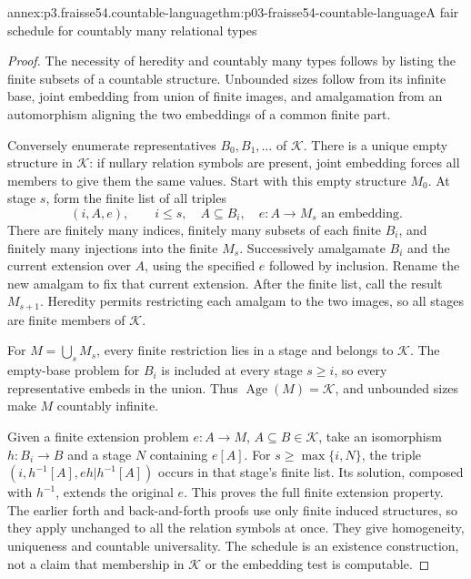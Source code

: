 \begin{annexitem}{annex:p3.fraisse54.countable-language}{thm:p03-fraisse54-countable-language}{A fair schedule for countably many relational types}
\begin{proof}
The necessity of heredity and countably many types follows by listing the
finite subsets of a countable structure. Unbounded sizes follow from its
infinite base, joint embedding from union of finite images, and amalgamation
from an automorphism aligning the two embeddings of a common finite part.

Conversely enumerate representatives \(B_0,B_1,\ldots\) of
\(\mathcal K\). There is a unique empty structure in \(\mathcal K\):
if nullary relation symbols are present, joint embedding forces all members
to give them the same values. Start with this empty structure \(M_0\).
At stage \(s\), form the finite list of all triples
\[
 (i,A,e),\qquad i\leq s,\quad A\subseteq B_i,
 \quad e:A\longrightarrow M_s\text{ an embedding}.
\]
There are finitely many indices, finitely many subsets of each finite
\(B_i\), and finitely many injections into the finite \(M_s\).
Successively amalgamate \(B_i\) and the current extension over \(A\),
using the specified \(e\) followed by inclusion. Rename the new amalgam
to fix that current extension. After the finite list, call the result
\(M_{s+1}\). Heredity permits restricting each amalgam to the two images,
so all stages are finite members of \(\mathcal K\).

For \(M=\bigcup_sM_s\), every finite restriction lies in a stage and
belongs to \(\mathcal K\). The empty-base problem for \(B_i\) is
included at every stage \(s\geq i\), so every representative embeds in
the union. Thus \(\operatorname{Age}(M)=\mathcal K\), and unbounded
sizes make \(M\) countably infinite.

Given a finite extension problem \(e:A\to M\), \(A\subseteq B\in
\mathcal K\), take an isomorphism \(h:B_i\to B\) and a stage \(N\)
containing \(e[A]\). For \(s\geq\max\{i,N\}\), the triple
\((i,h^{-1}[A],eh|h^{-1}[A])\) occurs in that stage's finite list.
Its solution, composed with \(h^{-1}\), extends the original \(e\).
This proves the full finite extension property. The earlier forth and
back-and-forth proofs use only finite induced structures, so they apply
unchanged to all the relation symbols at once. They give homogeneity,
uniqueness and countable universality. The schedule is an existence
construction, not a claim that membership in \(\mathcal K\) or the
embedding test is computable.
\end{proof}
\end{annexitem}


